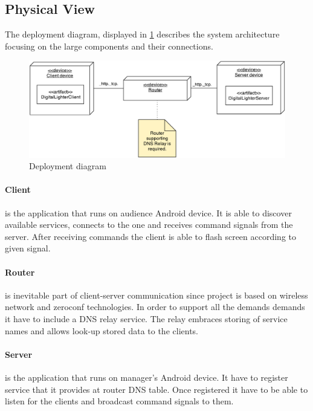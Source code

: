 \subsection{Physical View}
The deployment diagram, displayed in \ref{fig:deployment_diagram} describes the system architecture focusing on the large components and their connections.

\begin{figure}[H]
	\centering
		\includegraphics[width=15cm]{images/deployment-diagram-sprint1}
	\caption{Deployment diagram}
	\label{fig:deployment_diagram}
\end{figure}

\paragraph{Client}
is the application that runs on audience Android device. It is able to discover available services, connects to the one and receives command signals from the server. After receiving commands the client is able to flash screen according to given signal.

\paragraph{Router}
is inevitable part of client-server communication since project is based on wireless network and zeroconf technologies. In order to support all the demands demands it have to include a DNS relay service. The relay embraces storing of service names and allows look-up stored data to the clients.

\paragraph{Server}
is the application that runs on manager's Android device. It have to register service that it provides at router DNS table. Once registered it have to be able to listen for the clients and broadcast command signals to them.



